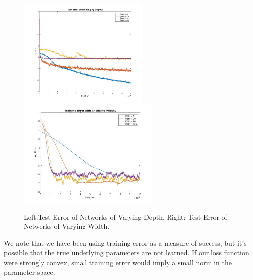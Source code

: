 \begin{figure}[h]
\vskip 0.1in
  \centering
\includegraphics[width = 2.5in]{plotChangeDepth.jpg}\includegraphics[width = 2.71in]{plotChangeWidth.jpg}
\caption{Left:Test Error of Networks of Varying Depth. Right: Test Error of Networks of Varying Width.}
\end{figure}
\vskip -0.1in
We note that we have been using training error as a measure of
success, but it's possible that the true underlying parameters are not
learned. If our loss function were strongly convex, small training
error would imply a small norm in the parameter space. 



